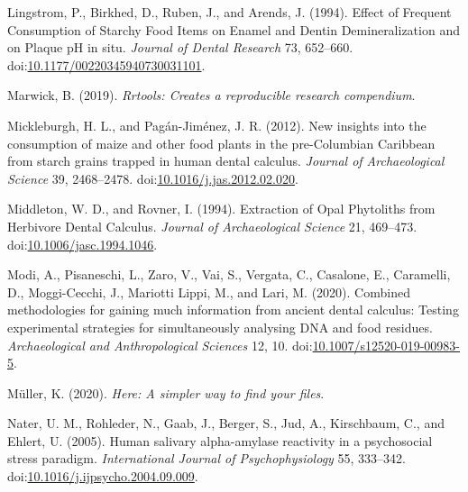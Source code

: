 \documentclass[utf8]{frontiers/frontiersSCNS}
\newlength{\cslhangindent}
\newlength{\cslentryspacingunit} %
\newenvironment{CSLReferences}[2] %
 {%
  \setlength{\parindent}{0pt}
  \ifodd #1
  \let\oldpar\par
  \def\par{\hangindent=\cslhangindent\oldpar}
  \fi
  \setlength{\parskip}{#2\cslentryspacingunit}
 }%
 {}
\begin{document}
\begin{CSLReferences}{1}{0}
\leavevmode{}%
Lingstrom, P., Birkhed, D., Ruben, J., and Arends, J. (1994). Effect of {Frequent Consumption} of {Starchy Food Items} on {Enamel} and {Dentin Demineralization} and on {Plaque pH} in situ. \emph{Journal of Dental Research} 73, 652--660. doi:\href{https://doi.org/10.1177/00220345940730031101}{10.1177/00220345940730031101}.

\leavevmode{}%
Marwick, B. (2019). \emph{Rrtools: {Creates} a reproducible research compendium}.

\leavevmode{}%
Mickleburgh, H. L., and Pagán-Jiménez, J. R. (2012). New insights into the consumption of maize and other food plants in the pre-{Columbian Caribbean} from starch grains trapped in human dental calculus. \emph{Journal of Archaeological Science} 39, 2468--2478. doi:\href{https://doi.org/10.1016/j.jas.2012.02.020}{10.1016/j.jas.2012.02.020}.

\leavevmode{}%
Middleton, W. D., and Rovner, I. (1994). Extraction of {Opal Phytoliths} from {Herbivore Dental Calculus}. \emph{Journal of Archaeological Science} 21, 469--473. doi:\href{https://doi.org/10.1006/jasc.1994.1046}{10.1006/jasc.1994.1046}.

\leavevmode{}%
Modi, A., Pisaneschi, L., Zaro, V., Vai, S., Vergata, C., Casalone, E., Caramelli, D., Moggi-Cecchi, J., Mariotti Lippi, M., and Lari, M. (2020). Combined methodologies for gaining much information from ancient dental calculus: Testing experimental strategies for simultaneously analysing {DNA} and food residues. \emph{Archaeological and Anthropological Sciences} 12, 10. doi:\href{https://doi.org/10.1007/s12520-019-00983-5}{10.1007/s12520-019-00983-5}.

\leavevmode{}%
Müller, K. (2020). \emph{Here: {A} simpler way to find your files}.

\leavevmode{}%
Nater, U. M., Rohleder, N., Gaab, J., Berger, S., Jud, A., Kirschbaum, C., and Ehlert, U. (2005). Human salivary alpha-amylase reactivity in a psychosocial stress paradigm. \emph{International Journal of Psychophysiology} 55, 333--342. doi:\href{https://doi.org/10.1016/j.ijpsycho.2004.09.009}{10.1016/j.ijpsycho.2004.09.009}.


\end{CSLReferences}
\end{document}
